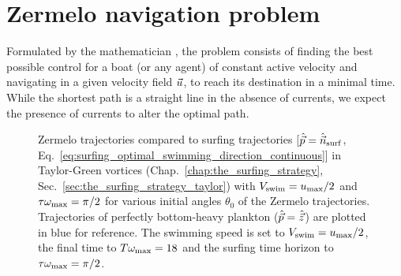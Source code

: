 \section{Zermelo navigation problem}

Formulated by the mathematician \citet{zermelo1931navigationsproblem}, the problem consists of finding the best possible control for a boat (or any agent) of constant active velocity and navigating in a given velocity field $\vec{u}$, to reach its destination in a minimal time.
While the shortest path is a straight line in the absence of currents, we expect the presence of currents to alter the optimal path.
\begin{figure}%
	\centering
	
	\caption[Zermelo trajectories compared to surfing trajectories in Taylor-Green vortices.]{
		Zermelo trajectories compared to surfing trajectories [$\hat{\vec{p}} = \hat{\vec{n}}_{\mathrm{surf}}$, Eq.~\eqref{eq:surfing_optimal_swimming_direction_continuous}] in Taylor-Green vortices (Chap.~\ref{chap:the_surfing_strategy}, Sec.~\ref{sec:the_surfing_strategy_taylor}) with $V_{\mathrm{swim}} = u_{\max}/2$ and $\tau \omega_{\max} = \pi/2$ for various initial angles $\theta_0$ of the Zermelo trajectories.
		Trajectories of perfectly bottom-heavy plankton ($\hat{\vec{p}} = \hat{\vec{z}}$) are plotted in blue for reference.
		The swimming speed is set to $V_{\mathrm{swim}} = u_{\max}/2$, the final time to $T \omega_{\max} = 18$ and the surfing time horizon to $\tau \omega_{\max} = \pi/2$.
	}
	\label{fig:taylor_green_vortex_zermelo}
\end{figure}

